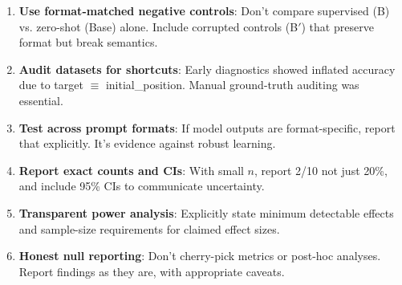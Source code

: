 \begin{enumerate}
    \item \textbf{Use format-matched negative controls}: Don't compare supervised (B) vs. zero-shot (Base) alone. Include corrupted controls (B$'$) that preserve format but break semantics.
    
    \item \textbf{Audit datasets for shortcuts}: Early diagnostics showed inflated accuracy due to target $\equiv$ initial\_position. Manual ground-truth auditing was essential.
    
    \item \textbf{Test across prompt formats}: If model outputs are format-specific, report that explicitly. It's evidence against robust learning.
    
    \item \textbf{Report exact counts and CIs}: With small $n$, report 2/10 not just 20\%, and include 95\% CIs to communicate uncertainty.
    
    \item \textbf{Transparent power analysis}: Explicitly state minimum detectable effects and sample-size requirements for claimed effect sizes.
    
    \item \textbf{Honest null reporting}: Don't cherry-pick metrics or post-hoc analyses. Report findings as they are, with appropriate caveats.
\end{enumerate}

